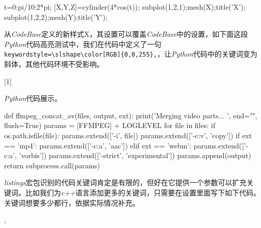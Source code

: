 \begin{Matlab}{}
t=0:pi/10:2*pi;
[X,Y,Z]=cylinder(4*cos(t));
subplot(1,2,1);mesh(X);title('X');
subplot(1,2,2);mesh(Y);title('Y');
\end{Matlab}

从\emph{CodeBase}定义的新样式X，其设置可以覆盖\emph{CodeBase}中的设置，如下面这段\emph{Python}代码高亮测试中，我们在代码中定义了一句\verb|keywordstyle=\slshape\color[RGB]{0,0,255},|，让\emph{Python}代码中的关键词变为斜体，其他代码环境不受影响。

\begin{latex}
[1]{\lstset{style=python}}{}
\end{latex}

\emph{Python}代码展示。

\begin{python}{}
def ffmpeg_concat_av(files, output, ext):
    print('Merging video parts... ', end="", flush=True)
    params = [FFMPEG] + LOGLEVEL
    for file in files:
        if os.path.isfile(file): params.extend(['-i', file])
    params.extend(['-c:v', 'copy'])
    if ext == 'mp4':
        params.extend(['-c:a', 'aac'])
    elif ext == 'webm':
        params.extend(['-c:a', 'vorbis'])
    params.extend(['-strict', 'experimental'])
    params.append(output)
    return subprocess.call(params)
\end{python}

\emph{listings}宏包识别的代码关键词肯定是有限的，但好在它提供一个参数可以扩充关键词。比如我们为\emph{c++}语言添加更多的关键词，只需要在设置里面写下如下代码。关键词想要多少都行，依据实际情况补充。

\begin{latex}
,
\end{latex}


